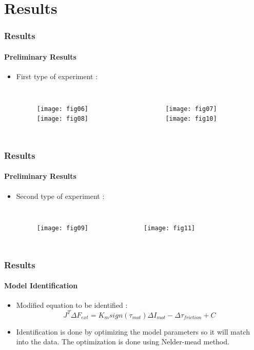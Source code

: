 \documentclass[12pt,english]{beamer}
\begin{document}
  \section{Results}
  \begin{frame}
    \frametitle{Results}
    \framesubtitle{Preliminary Results}
    \begin{itemize}
      \item First type of experiment :
      \begin{columns}
        \begin{figure}
          \texttt{[image: fig06]} \,
          \texttt{[image: fig08]} \,
        \end{figure}
        \begin{figure}
          \texttt{[image: fig07]} \,
          \texttt{[image: fig10]} \,
        \end{figure}
      \end{columns}
    \end{itemize}
  \end{frame}
  
  \begin{frame}
    \frametitle{Results}
    \framesubtitle{Preliminary Results}
    \begin{itemize}
      \item Second type of experiment :
      \begin{columns}
        \begin{figure}
          \texttt{[image: fig09]} \,
        \end{figure}
        \begin{figure}
          \texttt{[image: fig11]} \,
        \end{figure}
      \end{columns}
    \end{itemize}
  \end{frame}
  
  \begin{frame}
    \frametitle{Results}
    \framesubtitle{Model Identification}
    \begin{itemize}
    \item Modified equation to be identified :
    \begin{equation}
      J^{T} \Delta F_{ext} = K_{m} sign\left(\tau_{mot}\right) \Delta I_{mot} - \Delta \tau_{friction} + C
    \end{equation}
    \item Identification is done by optimizing the model parameters so it will match into the data. The optimization is done using Nelder-mead method.
    \end{itemize}
  \end{frame}
  
\end{document}
